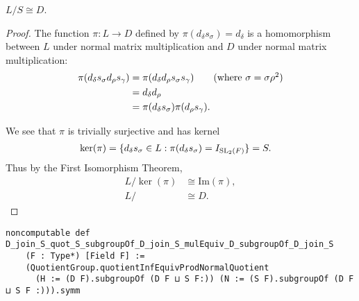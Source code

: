 \begin{lemma}
\label{SpecialSubgroups.D_join_S_quot_S_subgroupOf_D_join_S_mulEquiv_D_subgroupOf_D_join_S}
\leanok
    $L / S \cong D$.
\end{lemma}
\begin{proof} 
\leanok
The function $\pi: L \rightarrow D$ defined by $\pi(d_\delta s_\sigma) = d_\delta$ is a homomorphism between $L$ under normal matrix multiplication and $D$ under normal matrix multiplication:
\begin{align*} \pi(d_\delta s_\sigma d_\rho s_\gamma) &= \pi(d_\delta d_\rho s_\sigma s_\gamma) \tag{where $\sigma = \sigma \rho^{2}$}
\\ &= d_\delta d_\rho
\\ &= \pi(d_\delta s_\sigma)\pi(d_\rho s_\gamma).
\end{align*}

We see that $\pi$ is trivially surjective and has kernel
\begin{align*}  \ker(\pi) &= \{ d_\delta s_\sigma \in L : \pi(d_\delta s_\sigma) = I_{\operatorname{SL}_2(F)}\} = S.
\end{align*}
Thus by the First Isomorphism Theorem,
\begin{align*} L / \ker(\pi) &\cong \text{Im}(\pi), \\
L / &\cong D.
\end{align*}
\end{proof}
\begin{footnotesize}
\begin{verbatim}
noncomputable def D_join_S_quot_S_subgroupOf_D_join_S_mulEquiv_D_subgroupOf_D_join_S
    (F : Type*) [Field F] :=
    (QuotientGroup.quotientInfEquivProdNormalQuotient
      (H := (D F).subgroupOf (D F ⊔ S F:)) (N := (S F).subgroupOf (D F ⊔ S F :))).symm
\end{verbatim}
\end{footnotesize}



